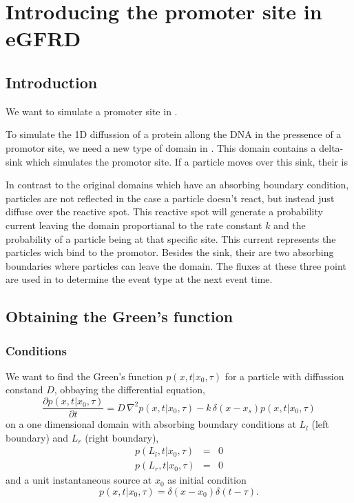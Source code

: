 \section{Introducing the promoter site in eGFRD}

\subsection{Introduction}
We want to simulate a promoter site in \GFRD. 

To simulate the 1D diffussion of a protein allong the DNA in the pressence of a promotor site, we need a new type of domain in \GFRD. This domain contains a delta-sink which simulates the promotor site. If a particle moves over this sink, their is


In contrast to the original domains which have an absorbing boundary condition, particles are not reflected in the case a particle doesn't react, but instead just diffuse over the reactive spot. This reactive spot will generate a probability current leaving the domain proportianal to the rate constant $k$ and the probability of a particle being at that specific site. This current represents the particles wich bind to the promotor. Besides the sink, their are two absorbing boundaries where particles can leave the domain. The fluxes at these three point are used in \GFRD to determine the event type at the next event time.

\subsection{Obtaining the Green's function}

\subsubsection{Conditions}

We want to find the Green's function $p(x,t|x_0,\tau)$ for a particle with diffussion constand $D$, obbaying the differential equation,
\begin{equation}
 \frac{\partial p(x,t|x_0,\tau)}{\partial t} = D \, \nabla ^2 p(x,t|x_0,\tau) - k \, \delta (x - x_s) p(x,t|x_0,\tau)
 \label{DE_I}
\end{equation}
on a one dimensional domain with absorbing boundary conditions at $L_l$ (left boundary) and $L_r$ (right boundary),
\begin{eqnarray}
 p(L_l,t|x_0,\tau) & = & 0 \\
 p(L_r,t|x_0,\tau) & = & 0
\label{BC_I}
\end{eqnarray}
and a unit instantaneous source at $x_0$ as initial condition
\begin{equation}
 p(x,t|x_0,\tau) = \delta(x-x_0) \delta(t-\tau).
\label{IC_I}
\end{equation}

